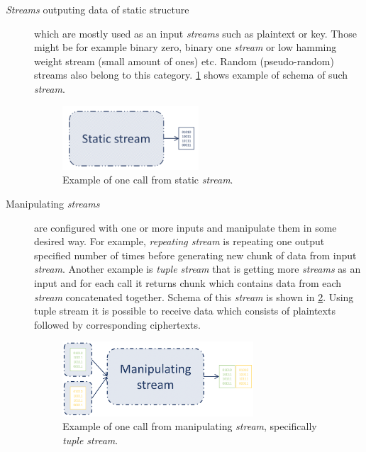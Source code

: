 \documentclass[
    digital,    %
    oneside,    %
    color,
    11pt,
    nocover,
    notable,
    nolof,
    nolot,
    final
]{fithesis3}
\begin{document}
\begin{description}
	\item[\textit{Streams} outputing data of static structure] which are mostly used as an input \textit{streams} such as plaintext or key. Those might be for example binary zero, binary one \textit{stream} or low hamming weight stream (small amount of ones) etc. Random (pseudo-random) streams also belong to this category. \cref{fig:static-stream} shows example of schema of such \textit{stream}.
	
	\begin{figure}[h]
		\centering
		\includegraphics[width=0.5\textwidth]{./images/pictures/static-stream.png}
		\caption{Example of one call from static \textit{stream}.}
		\label{fig:static-stream}
	\end{figure}

	\item[Manipulating \textit{streams}] are configured with one or more inputs and manipulate them in some desired way. For example, \textit{repeating stream} is repeating one output specified number of times before generating new chunk of data from input \textit{stream}. Another example is \textit{tuple stream} that is getting more \textit{streams} as an input and for each call it returns chunk which contains data from each \textit{stream} concatenated together. Schema of this \textit{stream} is shown in \cref{fig:manipulating-stream}. Using tuple stream it is possible to receive data which consists of plaintexts followed by corresponding ciphertexts. 
	\begin{figure}[h]
		\centering
		\includegraphics[width=0.7\textwidth]{./images/pictures/manipulating-stream.png}
		\caption{Example of one call from manipulating \textit{stream}, specifically \textit{tuple stream}. }
		\label{fig:manipulating-stream}
	\end{figure}
	

\end{description}
\end{document}
